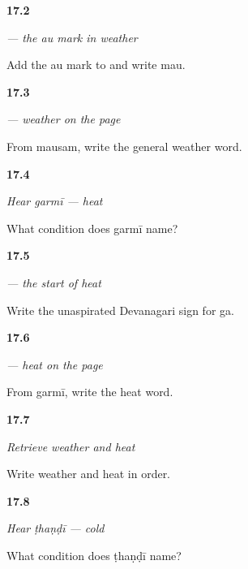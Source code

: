 \noindent\begin{minipage}[t]{\linewidth}
\raggedright
\hypertarget{review-MW-W12-au-matra-write}{\textbf{17.2}} \emph{ — the \emph{au} mark in weather}\par
\small Add the au mark to  and write mau.
\end{minipage}\par\medskip

\noindent\begin{minipage}[t]{\linewidth}
\raggedright
\hypertarget{review-MW-C12-mausam-dictation}{\textbf{17.3}} \emph{ — weather on the page}\par
\small From mausam, write the general weather word.
\end{minipage}\par\medskip

\noindent\begin{minipage}[t]{\linewidth}
\raggedright
\hypertarget{review-MW-C12-hear-garmi-meaning}{\textbf{17.4}} \emph{Hear \emph{garmī} — heat}\par
\small What condition does garmī name?
\end{minipage}\par\medskip

\noindent\begin{minipage}[t]{\linewidth}
\raggedright
\hypertarget{review-MW-W12-ga-write}{\textbf{17.5}} \emph{ — the start of heat}\par
\small Write the unaspirated Devanagari sign for ga.
\end{minipage}\par\medskip

\noindent\begin{minipage}[t]{\linewidth}
\raggedright
\hypertarget{review-MW-C12-garmi-dictation}{\textbf{17.6}} \emph{ — heat on the page}\par
\small From garmī, write the heat word.
\end{minipage}\par\medskip

\noindent\begin{minipage}[t]{\linewidth}
\raggedright
\hypertarget{review-MW-R12-weather-first-two-recall}{\textbf{17.7}} \emph{Retrieve weather and heat}\par
\small Write weather and heat in order.
\end{minipage}\par\medskip

\noindent\begin{minipage}[t]{\linewidth}
\raggedright
\hypertarget{review-MW-C12-hear-thandi-meaning}{\textbf{17.8}} \emph{Hear \emph{ṭhaṇḍī} — cold}\par
\small What condition does ṭhaṇḍī name?
\end{minipage}\par\medskip

